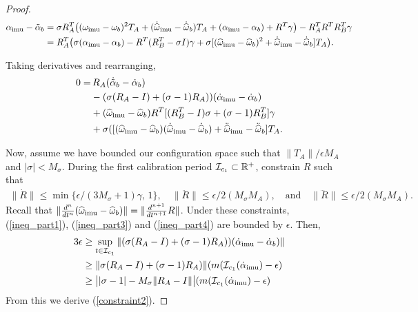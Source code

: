 \begin{proof}
\begin{align*}
\alpha_\mathrm{imu} - \tilde \alpha_b &= \sigma R_A^T \bigl(({\omega}_\mathrm{imu}  - {\omega}_b )^2 T_A 
+ (\dot{{\widehat{\omega}}}_\mathrm{imu}  - \dot{{\widehat{\omega}}}_b ) T_A
+ (\alpha_\mathrm{imu}  -\alpha_b) + R^T \gamma \bigr) - R_A^T R^T R_B^T \gamma \\
&= R^T_A\bigl(
\sigma (\alpha_\mathrm{imu}-\alpha_b) - R^T(R_B^T - \sigma I)\gamma 
+ \sigma [({\widehat{\omega}}_\mathrm{imu}  - {\widehat{\omega}}_b)^2 + \dot{{\widehat{\omega}}}_\mathrm{imu}  - \dot{{\widehat{\omega}}}_b ] T_A 
\bigr).
\end{align*}

Taking derivatives and rearranging,
\begin{align}
0 =&\, R_A(\dot{\tilde\alpha}_b - \dot\alpha_b) \label{ineq_part1}\\
&- (\sigma(R_A-I) + (\sigma-1)R_A))(\dot\alpha_\mathrm{imu}-\dot\alpha_b) \label{ineq_part2}\\
&+({\widehat{\omega}}_\mathrm{imu} - {\widehat{\omega}}_b)R^T[(R_B^T - I) \sigma + (\sigma-1)R_B^T]\gamma \label{ineq_part3}\\
&+ \sigma ([({\widehat{\omega}}_\mathrm{imu}  - {\widehat{\omega}}_b)(\dot{{\widehat{\omega}}}_\mathrm{imu}  - \dot{{\widehat{\omega}}}_b) + \ddot{{\widehat{\omega}}}_\mathrm{imu}  - \ddot{{\widehat{\omega}}}_b ] T_A. \label{ineq_part4}
\end{align}

Now, assume we have bounded our configuration space such that
$\|T_A\|/\epsilon M_A$ and $|\sigma|<M_\sigma$. 
During the first calibration period $\mathcal{I}_{c_1}\subset\mathbb{R}^+$, constrain $R$ such that 
\begin{align}
\|\dot R\|\leq\min\{\epsilon/(3M_\sigma+1)\gamma,\,1\},\quad
\|\ddot R\|\leq\epsilon/2(M_\sigma M_A),\quad\text{and}\quad
\|\dddot R\|\leq\epsilon/2(M_\sigma M_A). \label{calib_constraints}
\end{align}
Recall that $\|\tfrac{d^n}{dt^n}({\widehat{\omega}}_\mathrm{imu}-{\widehat{\omega}}_b)\|=\|\tfrac{d^{n+1}}{dt^{n+1}}R\|$.
Under these constraints, (\ref{ineq_part1}), (\ref{ineq_part3}) and (\ref{ineq_part4}) are bounded by
$\epsilon$.  Then,
\begin{align*}
3\epsilon&\geq\sup_{t\in\mathcal{I}_{c_1}}\|(\sigma(R_A-I) + (\sigma-1)R_A))(\dot\alpha_\mathrm{imu}-\dot\alpha_b)\|\\
&\geq\|\sigma(R_A-I) + (\sigma-1)R_A)\|({m}({\mathcal{I}_{c_1}}(\dot\alpha_\mathrm{imu}) - \epsilon)\\
&\geq\bigl||\sigma-1| - M_\sigma\|R_A-I\|\bigr|({m}({\mathcal{I}_{c_1}}(\dot\alpha_\mathrm{imu}) - \epsilon)
\end{align*}
From this we derive (\ref{constraint2}).


\end{proof}
